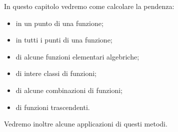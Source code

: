 % 
% 

In questo capitolo vedremo come calcolare la pendenza:
\begin{itemize} [nosep]
\item in un punto di una funzione;
\item in tutti i punti di una funzione;
\item di alcune funzioni elementari algebriche;
\item di intere classi di funzioni;
\item di alcune combinazioni di funzioni;
\item di funzioni trascendenti.
\end{itemize}
Vedremo inoltre alcune applicazioni di questi metodi.



